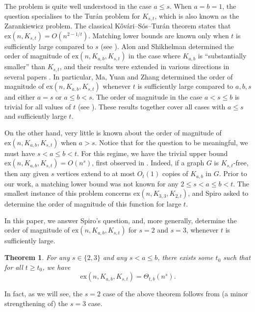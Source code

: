\documentclass[12pt]{article}
\newtheorem{theorem}{Theorem}[section]
\newcommand{\ex}{\mathrm{ex}}
\begin{document}
The problem is quite well understood in the case $a\leq s$. When $a=b=1$, the question specialises to the Tur\'an problem for $K_{s,t}$, which is also known as the Zarankiewicz problem. The classical K\H ov\'ari--S\'os--Tur\'an theorem \cite{KST54} states that $\ex(n,K_{s,t})=O(n^{2-1/t})$. Matching lower bounds are known only when $t$ is sufficiently large compared to $s$ (see \cite{KRS96,ARS99,bukh2024extremal}). Alon and Shikhelman \cite{alon2016many} determined the order of magnitude of $\ex(n,K_{a,b},K_{s,t})$ in the case where $K_{a,b}$ is ``substantially smaller'' than $K_{s,t}$, and their results were extended in various directions in several papers \cite{ma2018some,bayer2019exploring,gerbner2022generalized}. In particular, Ma, Yuan and Zhang \cite{ma2018some} determined the order of magnitude of $\ex(n,K_{a,b},K_{s,t})$ whenever $t$ is sufficiently large compared to $a,b,s$ and either $a=s$ or $a\leq b< s$. The order of magnitude in the case $a<s\leq b$ is trivial for all values of $t$ (see \cite{gerbner2022generalized}). These results together cover all cases with $a\leq s$ and sufficiently large $t$. 

On the other hand, very little is known about the order of magnitude of $\ex(n,K_{a,b},K_{s,t})$ when $a>s$. Notice that for the question to be meaningful, we must have $s< a\leq b < t$. For this regime, we have the trivial upper bound $\ex(n,K_{a,b},K_{s,t})=O(n^s)$, first observed in \cite{gerbner2019generalized}. Indeed, if a graph $G$ is $K_{s,t}$-free, then any given $s$ vertices extend to at most $O_t(1)$ copies of $K_{a,b}$ in $G$. Prior to our work, a matching lower bound was not known for any $2\leq s<a\leq b<t$. The smallest instance of this problem concerns $\ex(n,K_{3,3},K_{2,t})$, and Spiro \cite{spiro} asked to determine the order of magnitude of this function for large $t$.

In this paper, we answer Spiro's question, and, more generally, determine the order of magnitude of $\ex(n,K_{a,b},K_{s,t})$ for $s=2$ and $s=3$, whenever $t$ is sufficiently large.

\begin{theorem} \label{thm:k3t-free}
    For any $s\in \{2,3\}$ and any $s< a\leq b$, there exists some $t_0$ such that for all $t\geq t_0$, we have
    $$\ex(n,K_{a,b},K_{s,t})=\Theta_{t,b}(n^s).$$
\end{theorem}

In fact, as we will see, the $s=2$ case of the above theorem follows from (a minor strengthening of) the $s=3$ case.
\end{document}
